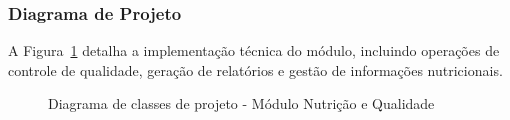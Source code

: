 \documentclass[12pt,a4paper]{article}
\begin{document}
\subsubsection{Diagrama de Projeto}

A Figura~\ref{fig:classe_nutricao_projeto} detalha a implementação técnica do módulo, incluindo operações de controle de qualidade, geração de relatórios e gestão de informações nutricionais.

\begin{figure}[H]
    \centering
    \caption{Diagrama de classes de projeto - Módulo Nutrição e Qualidade}
    \label{fig:classe_nutricao_projeto}
\end{figure}

\end{document}
